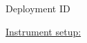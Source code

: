

{\Huge Deployment ID}\underline{\hspace{5cm}}\\\vspace{.5cm}

\underline{Instrument setup:}\\

\hspace{2cm}\begin{minipage}{\textwidth - 2cm}\addtolength{\baselineskip}{.5cm}
\\
\\
\end{minipage}

